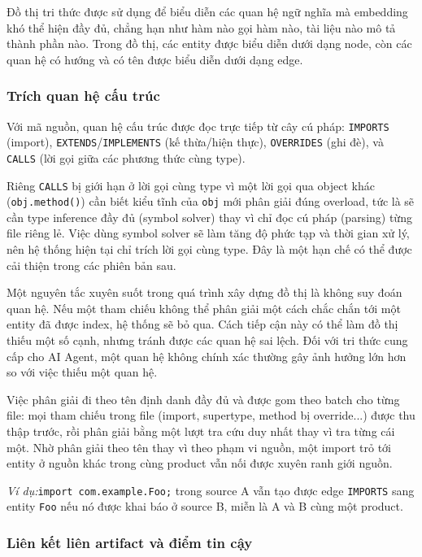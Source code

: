 Đồ thị tri thức được sử dụng để biểu diễn các quan hệ ngữ nghĩa mà embedding khó thể hiện đầy đủ, chẳng hạn như hàm nào gọi hàm nào, tài liệu nào mô tả thành phần nào. Trong đồ thị, các entity được biểu diễn dưới dạng node, còn các quan hệ có hướng và có tên được biểu diễn dưới dạng edge.

\subsubsection{Trích quan hệ cấu trúc}

Với mã nguồn, quan hệ cấu trúc được đọc trực tiếp từ cây cú pháp: \texttt{IMPORTS} (import), \texttt{EXTENDS}/\texttt{IMPLEMENTS} (kế thừa/hiện thực), \texttt{OVERRIDES} (ghi đè), và \texttt{CALLS} (lời gọi giữa các phương thức cùng type).

Riêng \texttt{CALLS} bị giới hạn ở lời gọi cùng type vì một lời gọi qua object khác (\texttt{obj.method()}) cần biết kiểu tĩnh của \texttt{obj} mới phân giải đúng overload, tức là sẽ cần type inference đầy đủ (symbol solver) thay vì chỉ đọc cú pháp (parsing) từng file riêng lẻ. Việc dùng symbol solver sẽ làm tăng độ phức tạp và thời gian xử lý, nên hệ thống hiện tại chỉ trích lời gọi cùng type. Đây là một hạn chế có thể được cải thiện trong các phiên bản sau.

Một nguyên tắc xuyên suốt trong quá trình xây dựng đồ thị là không suy đoán quan hệ. Nếu một tham chiếu không thể phân giải một cách chắc chắn tới một entity đã được index, hệ thống sẽ bỏ qua. Cách tiếp cận này có thể làm đồ thị thiếu một số cạnh, nhưng tránh được các quan hệ sai lệch. Đối với tri thức cung cấp cho AI Agent, một quan hệ không chính xác thường gây ảnh hưởng lớn hơn so với việc thiếu một quan hệ.

Việc phân giải đi theo tên định danh đầy đủ và được gom theo batch cho từng file: mọi tham chiếu trong file (import, supertype, method bị override...) được thu thập trước, rồi phân giải bằng một lượt tra cứu duy nhất thay vì tra từng cái một. Nhờ phân giải theo tên thay vì theo phạm vi nguồn, một import trỏ tới entity ở nguồn khác trong cùng product vẫn nối được xuyên ranh giới nguồn.

\textit{Ví dụ:}\texttt{import com.example.Foo;} trong source A vẫn tạo được edge \texttt{IMPORTS} sang entity \texttt{Foo} nếu nó được khai báo ở source B, miễn là A và B cùng một product.


\subsubsection{Liên kết liên artifact và điểm tin cậy}

